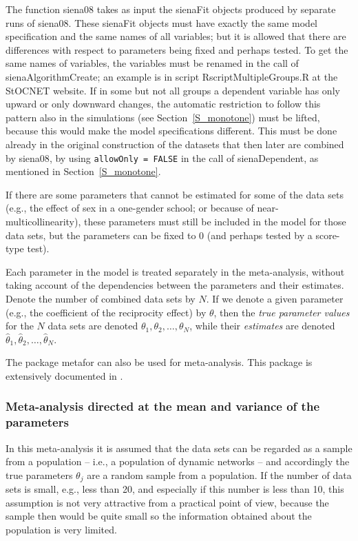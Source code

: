 \documentclass[a4paper,fleqn,11pt]{article}
\newcommand{\+}{\, + \,}
\newcommand{\sfn}[1]{\textsf{#1}}
\newcommand{\SN}{{\sf StOCNET }}
\begin{document}
The function  \textsf{siena08} takes as input the \textsf{sienaFit}
objects produced by separate runs of  \textsf{siena08}.
These \textsf{sienaFit} objects must have exactly the same model
specification and the same names of all variables; but it is allowed
that there are differences with respect to parameters being fixed
and perhaps tested. To get the same names of variables, the
variables must be renamed in the call of \textsf{sienaAlgorithmCreate};
an example is in script \textsf{RscriptMultipleGroups.R} at the \SN website.
If in some but not all groups a dependent variable has only upward or
only downward changes, the automatic restriction to follow this pattern also
in the simulations (see Section~\ref{S_monotone}) must be lifted,
because this would make the model specifications different.
This must be done already in the original construction of the datasets that
then later are combined by \textsf{siena08},
by using \texttt{allowOnly = FALSE} in the call of \sfn{sienaDependent},
as mentioned in Section~\ref{S_monotone}.

If there are some parameters that cannot be estimated for some of the data sets
(e.g., the effect of sex in a one-gender school; or because of
near-multicollinearity), these parameters must still be included
in the model for those data sets, but the parameters can be fixed to 0
(and perhaps tested by a score-type test).
\medskip

Each parameter in the model is treated separately
in the meta-analysis, without taking account of the
dependencies between the parameters and their estimates.
Denote the number of combined data sets by $N$.
If we denote a given parameter (e.g., the
coefficient of the reciprocity effect) by $\theta$,
then the \emph{true parameter values} for the
$N$ data sets are denoted $\theta_1, \theta_2, \ldots, \theta_N$,
while their \emph{estimates} are denoted
 $\hat\theta_1, \hat\theta_2, \ldots, \hat\theta_N$.

The package \sfn{metafor} can also be used for meta-analysis.
This package is extensively documented in \citet{Viechtbauer2010}.

\subsubsection{Meta-analysis directed at the mean
               and variance of the parameters}

In this meta-analysis it is assumed that the data sets can be
regarded as a sample from a population -- i.e., a population
of dynamic networks -- and accordingly the true parameters
$\theta_j$  are a random sample from a population.
If the number of data sets is small, e.g., less than 20,
and especially if this number is less than 10,
this assumption is not very attractive from a practical point of view,
because the sample then would be quite small
so the information obtained about the population is very limited.
\end{document}
